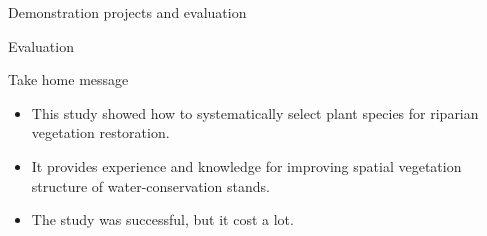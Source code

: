 \begin{frame}{Demonstration projects and evaluation}
{\begin{exampleblock}{Evaluation}
\end{exampleblock}
}

\end{frame}


\begin{frame}{Take home message}
  \begin{itemize}
\item  This study showed how to systematically select plant species for riparian vegetation restoration.
\item  It provides experience and knowledge for improving spatial vegetation structure of water-conservation stands.
\item  The study was successful, but it cost a lot.
  \end{itemize}
\end{frame}